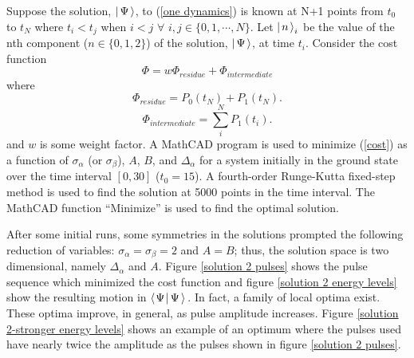 Suppose the solution, $\left| \hspace{0.15em} \Psi \hspace{0.15em}\right\rangle$, to (\ref{one dynamics}) is known at N+1 points from $t_0$ to $t_N$ where $t_i<t_j$ when $i<j$ $\forall$  $i,j \in \{0,1,\cdots,N\}$. Let $\left| \hspace{0.15em} n \hspace{0.15em}\right\rangle_i$ be the value of the nth component ($n \in \{ 0,1,2 \}$) of the solution, $\left| \hspace{0.15em} \Psi \hspace{0.15em}\right\rangle$, at time $t_i$. Consider the cost function
\begin{equation}
\Phi
=
w\Phi_{residue}
+
\Phi_{intermediate}
\label{cost}
\end{equation}
where
\begin{equation}
\Phi_{residue}
=
P_0(t_N)
+
P_1(t_N).
\label{residue cost}
\end{equation}
\begin{equation}
\Phi_{intermediate}
=
\sum_i^N
P_1(t_i).
\label{int cost}
\end{equation}
and $w$ is some weight factor.
A MathCAD program is used to minimize (\ref{cost}) as a function of $\sigma_\alpha$ (or $\sigma_\beta$), $A$, $B$, and $\Delta_\alpha$ for a system initially in the ground state over the time interval $[0,30]$ ($t_0 = 15$). A fourth-order Runge-Kutta fixed-step method is used to find the solution at 5000 points in the time interval. The MathCAD function ``Minimize'' is used to find the optimal solution.

After some initial runs, some symmetries in the solutions prompted the following reduction of variables: $\sigma_\alpha=\sigma_\beta=2$ and $A=B$; thus, the solution space is two dimensional, namely $\Delta_{\alpha}$ and $A$. Figure \ref{solution 2 pulses} shows the pulse sequence which minimized the cost function and figure \ref{solution 2 energy levels} show the resulting motion in $\left\langle \hspace{0.10em} \Psi \hspace{0.10em} \right| \Psi \left\rangle \right.$. In fact, a family of local optima exist. These optima improve, in general, as pulse amplitude increases. Figure \ref{solution 2-stronger energy levels} shows an example of an optimum where the pulses used have nearly twice the amplitude as the pulses shown in figure \ref{solution 2 pulses}.

